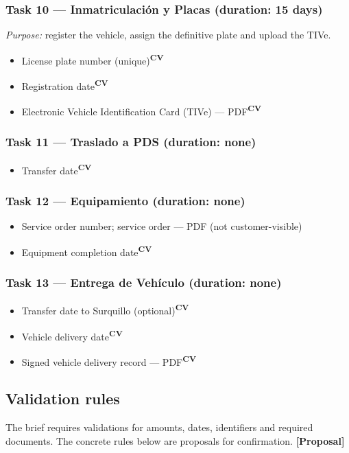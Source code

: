 \documentclass[11pt,a4paper]{article}
\newcommand{\tagprop}{\textcolor{orange!80!black}{\textbf{[Proposal]}}}
\newcommand{\cv}{\textsuperscript{\textcolor{panablue}{\textbf{CV}}}}
\begin{document}
\subsubsection*{Task 10 --- Inmatriculación y Placas (duration: 15 days)}
\textit{Purpose:} register the vehicle, assign the definitive plate and upload
the TIVe.
\begin{itemize}
	\item License plate number (unique)\cv{}
	\item Registration date\cv{}
	\item Electronic Vehicle Identification Card (TIVe) --- PDF\cv{}
\end{itemize}

\subsubsection*{Task 11 --- Traslado a PDS (duration: none)}
\begin{itemize}
	\item Transfer date\cv{}
\end{itemize}

\subsubsection*{Task 12 --- Equipamiento (duration: none)}
\begin{itemize}
	\item Service order number; service order --- PDF (not customer-visible)
	\item Equipment completion date\cv{}
\end{itemize}

\subsubsection*{Task 13 --- Entrega de Vehículo (duration: none)}
\begin{itemize}
	\item Transfer date to Surquillo (optional)\cv{}
	\item Vehicle delivery date\cv{}
	\item Signed vehicle delivery record --- PDF\cv{}
\end{itemize}

\subsection{Validation rules}

The brief requires validations for amounts, dates, identifiers and required
documents. The concrete rules below are proposals for confirmation. \tagprop{}
\end{document}
